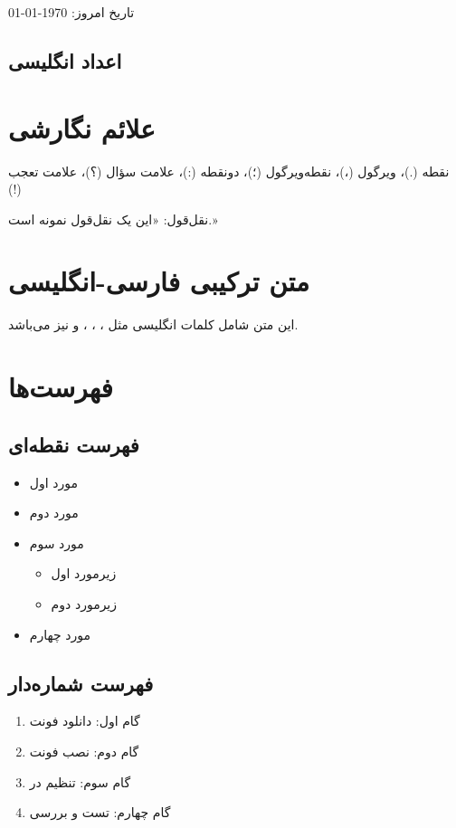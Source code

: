 \documentclass[12pt,a4paper]{article}
\begin{document}
تاریخ امروز: \today

\subsection{اعداد انگلیسی}

\section{علائم نگارشی}
نقطه (.)، ویرگول (،)، نقطه‌ویرگول (؛)، دونقطه (:)، علامت سؤال (؟)، علامت تعجب (!)

نقل‌قول: «این یک نقل‌قول نمونه است.»

\section{متن ترکیبی فارسی-انگلیسی}
این متن شامل کلمات انگلیسی مثل ، ، ،  و  نیز می‌باشد.

\section{فهرست‌ها}

\subsection{فهرست نقطه‌ای}
\begin{itemize}
\item مورد اول
\item مورد دوم
\item مورد سوم
    \begin{itemize}
    \item زیرمورد اول
    \item زیرمورد دوم
    \end{itemize}
\item مورد چهارم
\end{itemize}

\subsection{فهرست شماره‌دار}
\begin{enumerate}
\item گام اول: دانلود فونت
\item گام دوم: نصب فونت
\item گام سوم: تنظیم در 
\item گام چهارم: تست و بررسی
\end{enumerate}
\end{document}
